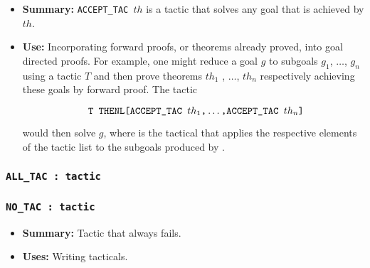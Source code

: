 \begin{itemize}

\item{\bf Summary:} {\small\verb|ACCEPT_TAC |}$th$
is a tactic that solves any goal that is
achieved by $th$.

\item{\bf Use:} Incorporating forward proofs, or theorems already
  proved, into goal directed proofs.  For example, one might reduce a
  goal $g$ to subgoals $g_1$, $\dots$, $g_n$ using a tactic $T$ and
  then prove theorems $th_1$ , $\dots$, $th_n$ respectively achieving
  these goals by forward proof. The tactic

\[\ml{  T THENL[ACCEPT\_TAC }th_1\ml{,}\ldots\ml{,ACCEPT\_TAC }th_n\ml{]}
\]

would then solve $g$, where 
is the tactical that applies the respective elements of the tactic
list to the subgoals produced by .

\end{itemize}



\subsubsection{\tt ALL\_TAC : tactic}


\subsubsection{\tt NO\_TAC : tactic}

\begin{itemize}
\item{\bf Summary:} Tactic that always fails.

\item{\bf Uses:} Writing tacticals.
\end{itemize}

